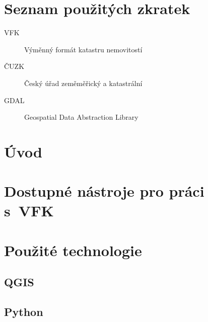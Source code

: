 \documentclass[12pt]{article}
\begin{document}
\vspace{12pt}

\vspace{2cm}

\clearpage
{}		 %
\section*{Seznam použitých zkratek}

\begin{description}
\item[VFK] Výměnný formát katastru nemovitostí
\item[ČUZK] Český úřad zeměměřický a katastrální
\item[GDAL] Geospatial Data Abstraction Library
\end{description}


\clearpage
\rhead{{\rightmark}}		%
\tableofcontents

\clearpage
\pagestyle{fancy}		%
\setcounter{page}{1}   	%
\section*{Úvod}




\clearpage
\rhead{{\rightmark}}
\section{Dostupné nástroje pro práci s~VFK}


\clearpage
\section{Použité technologie}

\subsection{QGIS}

\subsection{Python}
\end{document}
